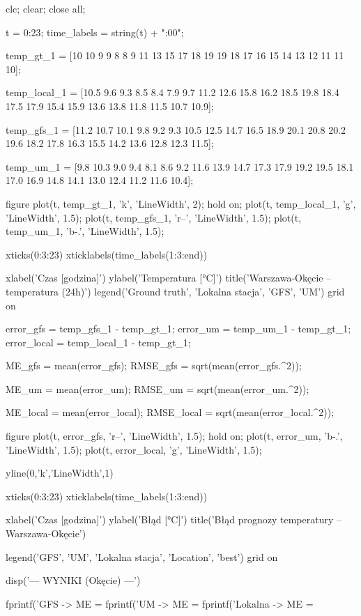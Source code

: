 clc; clear; close all;

t = 0:23;
time_labels = string(t) + ":00";


temp_gt_1 = [10 10 9 9 8 8 9 11 13 15 17 18 19 19 18 17 16 15 14 13 12 11 11 10];

temp_local_1 = [10.5 9.6 9.3 8.5 8.4 7.9 9.7 11.2 12.6 15.8 16.2 18.5 19.8 18.4 17.5 17.9 15.4 15.9 13.6 13.8 11.8 11.5 10.7 10.9];

temp_gfs_1 = [11.2 10.7 10.1 9.8 9.2 9.3 10.5 12.5 14.7 16.5 18.9 20.1 20.8 20.2 19.6 18.2 17.8 16.3 15.5 14.2 13.6 12.8 12.3 11.5];

temp_um_1 = [9.8 10.3 9.0 9.4 8.1 8.6 9.2 11.6 13.9 14.7 17.3 17.9 19.2 19.5 18.1 17.0 16.9 14.8 14.1 13.0 12.4 11.2 11.6 10.4];


figure
plot(t, temp_gt_1, 'k', 'LineWidth', 2); hold on;
plot(t, temp_local_1, 'g', 'LineWidth', 1.5);
plot(t, temp_gfs_1, 'r--', 'LineWidth', 1.5);
plot(t, temp_um_1, 'b-.', 'LineWidth', 1.5);

xticks(0:3:23)
xticklabels(time_labels(1:3:end))

xlabel('Czas [godzina]')
ylabel('Temperatura [°C]')
title('Warszawa-Okęcie – temperatura (24h)')
legend('Ground truth', 'Lokalna stacja', 'GFS', 'UM')
grid on


error_gfs   = temp_gfs_1   - temp_gt_1;
error_um    = temp_um_1    - temp_gt_1;
error_local = temp_local_1 - temp_gt_1;


ME_gfs = mean(error_gfs);
RMSE_gfs = sqrt(mean(error_gfs.^2));

ME_um = mean(error_um);
RMSE_um = sqrt(mean(error_um.^2));

ME_local = mean(error_local);
RMSE_local = sqrt(mean(error_local.^2));


figure
plot(t, error_gfs, 'r--', 'LineWidth', 1.5); hold on;
plot(t, error_um, 'b-.', 'LineWidth', 1.5);
plot(t, error_local, 'g', 'LineWidth', 1.5);

yline(0,'k','LineWidth',1)

xticks(0:3:23)
xticklabels(time_labels(1:3:end))

xlabel('Czas [godzina]')
ylabel('Błąd [°C]')
title('Błąd prognozy temperatury – Warszawa-Okęcie')

legend('GFS', 'UM', 'Lokalna stacja', 'Location', 'best')
grid on


disp('--- WYNIKI (Okęcie) ---')

fprintf('GFS     -> ME = %
fprintf('UM      -> ME = %
fprintf('Lokalna -> ME = %